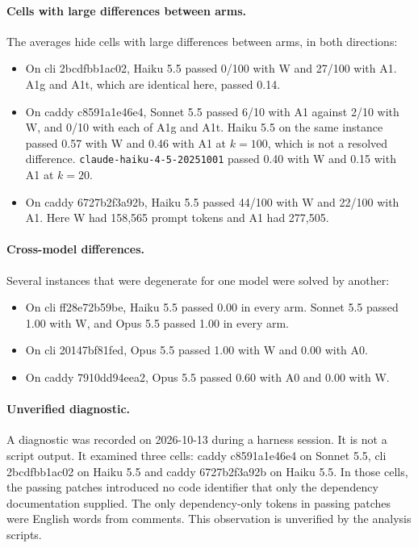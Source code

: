 \paragraph{Cells with large differences between arms.} The averages hide cells with large differences between arms, in both directions:
\begin{itemize}
\item On cli 2bcdfbb1ac02, Haiku 5.5 passed 0/100 with W and 27/100 with A1. A1g and A1t, which are identical here, passed 0.14.
\item On caddy c8591a1e46e4, Sonnet 5.5 passed 6/10 with A1 against 2/10 with W, and 0/10 with each of A1g and A1t. Haiku 5.5 on the same instance passed 0.57 with W and 0.46 with A1 at $k=100$, which is not a resolved difference. \texttt{claude-haiku-4-5-20251001} passed 0.40 with W and 0.15 with A1 at $k=20$.
\item On caddy 6727b2f3a92b, Haiku 5.5 passed 44/100 with W and 22/100 with A1. Here W had 158,565 prompt tokens and A1 had 277,505.
\end{itemize}

\paragraph{Cross-model differences.} Several instances that were degenerate for one model were solved by another:
\begin{itemize}
\item On cli ff28e72b59be, Haiku 5.5 passed 0.00 in every arm. Sonnet 5.5 passed 1.00 with W, and Opus 5.5 passed 1.00 in every arm.
\item On cli 20147bf81fed, Opus 5.5 passed 1.00 with W and 0.00 with A0.
\item On caddy 7910dd94eea2, Opus 5.5 passed 0.60 with A0 and 0.00 with W.
\end{itemize}

\paragraph{Unverified diagnostic.} A diagnostic was recorded on 2026-10-13 during a harness session. It is not a script output. It examined three cells: caddy c8591a1e46e4 on Sonnet 5.5, cli 2bcdfbb1ac02 on Haiku 5.5 and caddy 6727b2f3a92b on Haiku 5.5. In those cells, the passing patches introduced no code identifier that only the dependency documentation supplied. The only dependency-only tokens in passing patches were English words from comments. This observation is unverified by the analysis scripts.

